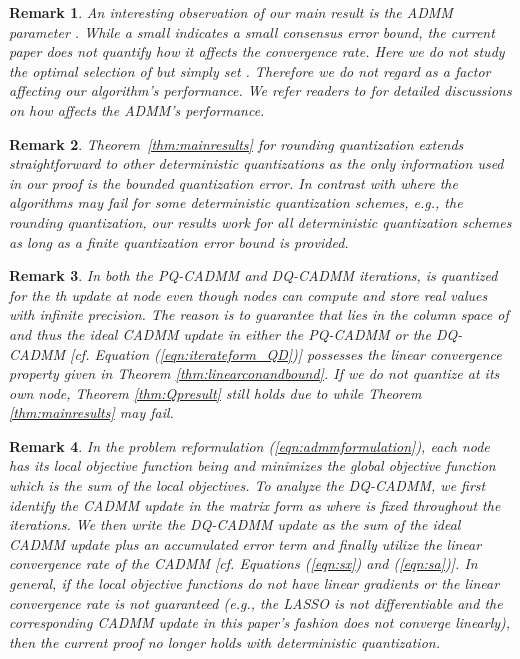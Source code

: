 \documentclass[journal]{IEEEtran}
\newtheorem{remark}{Remark}
\begin{document}
\begin{remark} 
\label{rmk:rho}
An interesting observation of our main result is the ADMM parameter . While a small  indicates a small consensus error bound, the current paper does not quantify how it affects the convergence rate. Here we do not study the optimal selection of  but simply set . Therefore we do not regard  as a factor affecting our algorithm's performance. We refer readers to \cite{BoydADMM,Shi2014,Ghadimi2015ParaSel} for detailed discussions on how  affects the ADMM's performance.  
\end{remark}
\begin{remark}
Theorem~\ref{thm:mainresults} for rounding quantization extends straightforward to other deterministic quantizations as the only information used in our proof is the bounded quantization error. In contrast with \cite{Kashyap2007,Nedic2009} where the algorithms may fail for some deterministic quantization schemes, e.g., the rounding quantization, our results work for all deterministic quantization schemes as long as a finite quantization error bound is provided. 
\end{remark}
\begin{remark}
\label{rmk:Qitself}
In both the PQ-CADMM and DQ-CADMM iterations,  is quantized for the th update at node  even though nodes can compute and store real values with infinite precision. The reason is to guarantee that  lies in the column space of  and thus the ideal CADMM update in either the PQ-CADMM or the DQ-CADMM [cf. Equation (\ref{eqn:iterateform_QD})] possesses the linear convergence property given in Theorem \ref{thm:linearconandbound}. If we do not quantize  at its own node, Theorem \ref{thm:Qpresult} still holds due to  while Theorem \ref{thm:mainresults} may fail.
\end{remark}
\begin{remark}
In the problem reformulation (\ref{eqn:admmformulation}), each node  has its local objective function being  and  minimizes the global objective function  which is the sum of the local objectives. To analyze the DQ-CADMM, we first identify the CADMM update in the matrix form as  where  is fixed throughout the iterations. We then write the DQ-CADMM update as the sum of the ideal CADMM update plus an accumulated error term and finally utilize the linear convergence rate of the CADMM [cf. Equations (\ref{eqn:sx}) and (\ref{eqn:sa})]. In general, if the local objective functions do not have linear gradients or the linear convergence rate is not guaranteed (e.g., the LASSO is not differentiable and the corresponding CADMM update in this paper's fashion does not converge linearly), then the current proof no longer holds with deterministic quantization.
\end{remark}
\end{document}
